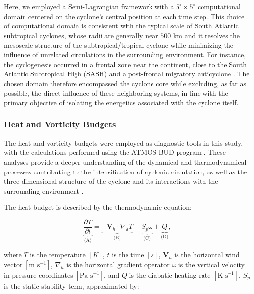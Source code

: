 \documentclass[pdflatex,sn-chicago]{sn-jnl}%
\theoremstyle{plain}
\theoremstyle{definition}
\theoremstyle{remark}
\theoremstyle{definition}
\begin{document}
Here, we employed a Semi-Lagrangian framework \citep{michaelides1999quasi} with a $5^\circ \times 5^\circ$ computational domain centered on the cyclone's central position at each time step. This choice of computational domain is consistent with the typical scale of South Atlantic subtropical cyclones, whose radii are generally near $500$ km \citep{gozzo2014subtropical} and it resolves the mesoscale structure of the subtropical/tropical cyclone while minimizing the influence of unrelated circulations in the surrounding environment. For instance, the cyclogenesis occurred in a frontal zone near the continent, close to the South Atlantic Subtropical High (SASH) and a post-frontal migratory anticyclone \citep{reboita2024assessment}. The chosen domain therefore encompassed the cyclone core while excluding, as far as possible, the direct influence of these neighboring systems, in line with the primary objective of isolating the energetics associated with the cyclone itself.


\subsubsection{Heat and Vorticity Budgets}

The heat and vorticity budgets were employed as diagnostic tools in this study, with the calculations performed using the ATMOS-BUD program \citep{de2025atmosbud}. These analyses provide a deeper understanding of the dynamical and thermodynamical processes contributing to the intensification of cyclonic circulation, as well as the three-dimensional structure of the cyclone and its interactions with the surrounding environment \citep[e.g.,][]{dutra2017structure}.

The heat budget is described by the thermodynamic equation:

\begin{equation}
\underbrace{\frac{\partial T}{\partial t}}_{\text{(A)}} = 
\underbrace{-\mathbf{V}_h \cdot \nabla_h T}_{\text{(B)}} 
- \underbrace{S_p \omega}_{\text{(C)}} 
+ \underbrace{Q}_{\text{(D)}},
\end{equation}

where \(T\) is the temperature \([K]\), \(t\) is the time \([s]\), \(\mathbf{V}_h\) is the horizontal wind vector \([\text{m s}^{-1}]\), \(\nabla_h\) is the horizontal gradient operator \(\omega\) is the vertical velocity in pressure coordinates \([\text{Pa s}^{-1}]\), and \(Q\) is the diabatic heating rate \([\text{K s}^{-1}]\). \(S_p\) is the static stability term, approximated by:
\end{document}
